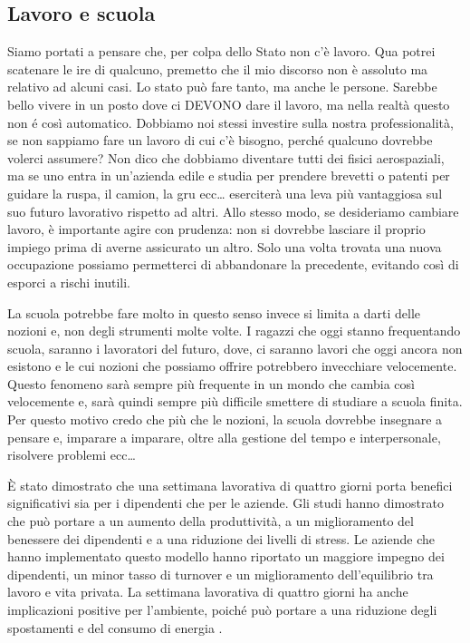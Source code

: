 \documentclass[12pt]{book} %
\begin{document}
\subsection{Lavoro e scuola}
Siamo portati a pensare che, per colpa dello Stato non
c'è lavoro. Qua potrei scatenare le ire di qualcuno, premetto che il mio discorso non è assoluto
ma relativo ad alcuni casi. Lo stato può fare tanto, ma anche le persone. Sarebbe bello vivere in un posto
dove ci DEVONO dare il lavoro, ma nella realtà questo non é così automatico. Dobbiamo noi stessi investire sulla nostra
professionalità, se non sappiamo fare un lavoro di cui c'è bisogno, perché qualcuno dovrebbe volerci assumere? 
Non dico che dobbiamo
diventare tutti dei fisici aerospaziali, ma se uno entra in un'azienda edile e studia per prendere
brevetti o patenti per guidare la ruspa, il camion, la gru ecc… eserciterà una leva più vantaggiosa sul suo
futuro lavorativo rispetto ad altri. 
Allo stesso modo, se desideriamo cambiare lavoro, è importante agire con prudenza: non si dovrebbe lasciare il proprio impiego prima di averne assicurato un altro. Solo una volta trovata una nuova occupazione possiamo permetterci di abbandonare la precedente, evitando così di esporci a rischi inutili.

La scuola potrebbe fare molto in questo senso invece si
limita a darti delle nozioni e, non degli strumenti molte volte. I ragazzi che oggi stanno frequentando scuola, saranno
i lavoratori del futuro, dove, ci saranno lavori che oggi ancora non esistono e le cui nozioni che possiamo offrire potrebbero invecchiare velocemente. Questo fenomeno sarà sempre più frequente in un mondo che cambia così velocemente e, sarà quindi sempre più difficile smettere di studiare a scuola finita. Per questo motivo credo che più che le nozioni, la scuola dovrebbe insegnare a pensare e, imparare a imparare, oltre alla gestione del tempo e interpersonale, risolvere problemi ecc… 

\begin{mdframed}[linewidth=1pt]
È stato dimostrato che una settimana lavorativa di quattro giorni porta benefici significativi sia per i dipendenti che per le aziende. Gli studi hanno dimostrato che può portare a un aumento della produttività, a un miglioramento del benessere dei dipendenti e a una riduzione dei livelli di stress. Le aziende che hanno implementato questo modello hanno riportato un maggiore impegno dei dipendenti, un minor tasso di turnover e un miglioramento dell'equilibrio tra lavoro e vita privata. La settimana lavorativa di quattro giorni ha anche implicazioni positive per l'ambiente, poiché può portare a una riduzione degli spostamenti e del consumo di energia .
\end{mdframed}
\end{document}
